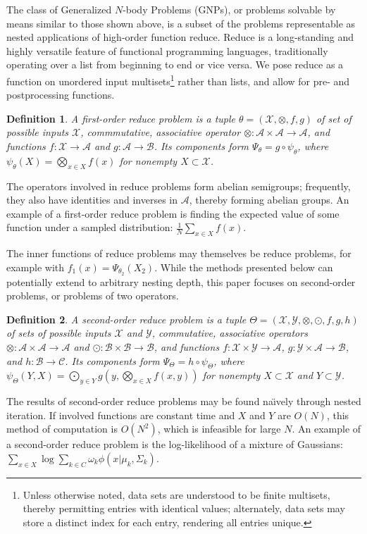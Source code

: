 \documentclass{article}
\newtheorem{definition} {Definition}
\newcommand{\comp}{\mathbin{\circ}}
\begin{document}
The class of Generalized $N$-body Problems (GNPs), or problems
solvable by means similar to those shown above, is a subset of the
problems representable as nested applications of high-order function
reduce.  Reduce is a long-standing and highly versatile feature of
functional programming languages, traditionally operating over a list
from beginning to end or vice versa.  We pose reduce as a function on
unordered input multisets\footnote{Unless otherwise noted, data sets
are understood to be finite multisets, thereby permitting entries with
identical values; alternately, data sets may store a distinct index
for each entry, rendering all entries unique.} rather than lists, and
allow for pre- and postprocessing functions.
\begin{definition}
  A {\em first-order reduce problem} is a tuple $\theta =
  (\mathcal{X},\otimes,f,g)$ of set of possible inputs $\mathcal{X}$,
  commmutative, associative operator $\otimes \colon \mathcal{A}
  \times \mathcal{A} \to \mathcal{A}$, and functions $f \colon
  \mathcal{X} \to \mathcal{A}$ and $g \colon \mathcal{A} \to
  \mathcal{B}$.  Its components form $\Psi_{\theta} = g \comp
  \psi_{\theta}$, where $\psi_{\theta}(X) = \bigotimes_{x \in X} f(x)$
  for nonempty $X \subset \mathcal{X}$.
\end{definition}
\noindent The operators involved in reduce problems form abelian
semigroups; frequently, they also have identities and inverses in
$\mathcal{A}$, thereby forming abelian groups.  An example of a
first-order reduce problem is finding the expected value of some
function under a sampled distribution: $\frac{1}{N} \sum_{x \in X}
f(x)$.

The inner functions of reduce problems may themselves be reduce
problems, for example with $f_1(x) = \Psi_{\theta_2}(X_2)$.  While the
methods presented below can potentially extend to arbitrary nesting
depth, this paper focuses on second-order problems, or problems of two
operators.
\begin{definition}
  A {\em second-order reduce problem} is a tuple $\Theta =
  (\mathcal{X},\mathcal{Y},\otimes,\odot,f,g,h)$ of sets of possible
  inputs $\mathcal{X}$ and $\mathcal{Y}$, commutative, associative
  operators $\otimes \colon \mathcal{A} \times \mathcal{A} \to
  \mathcal{A}$ and $\odot \colon \mathcal{B} \times \mathcal{B} \to
  \mathcal{B}$, and functions $f \colon \mathcal{X} \times \mathcal{Y}
  \to \mathcal{A}$, $g \colon \mathcal{Y} \times \mathcal{A} \to
  \mathcal{B}$, and $h \colon \mathcal{B} \to \mathcal{C}$.  Its
  components form $\Psi_{\Theta} = h \comp \psi_{\Theta}$, where
  $\psi_{\Theta}(Y,X) = \bigodot_{y \in Y} g \left( y,\bigotimes_{x
  \in X} f(x,y) \right)$ for nonempty $X \subset \mathcal{X}$ and $Y
  \subset \mathcal{Y}$.
\end{definition}
\noindent The results of second-order reduce problems may be found
na\"{\i}vely through nested iteration.  If involved functions are
constant time and $X$ and $Y$ are $O(N)$, this method of computation
is $O(N^2)$, which is infeasible for large $N$.  An example of a
second-order reduce problem is the log-likelihood of a mixture of
Gaussians: $\sum_{x \in X} \log \sum_{k \in C} \omega_k \phi(x |
\mu_k, \Sigma_k)$.
\end{document}
